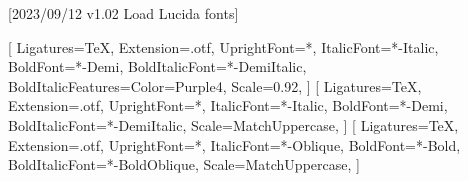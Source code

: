 
[2023/09/12 v1.02 Load Lucida fonts]



\ifpdftex
	\RequirePackage[LY1]{fontenc}
	\RequirePackage{bm}
\else
    \RequirePackage[warnings-off={mathtools-colon,mathtools-overbracket}]{unicode-math}

    
    \setmainfont{LucidaBrightOT}[%
          Ligatures=TeX,
          Extension=.otf,
          UprightFont=*,
          ItalicFont=*-Italic,
          BoldFont=*-Demi,
    	  BoldItalicFont=*-DemiItalic,
          BoldItalicFeatures={Color=Purple4},
    	  Scale=0.92,
      ]
    \setsansfont{LucidaSansOT}[%
          Ligatures=TeX,
          Extension=.otf,
          UprightFont=*,
          ItalicFont=*-Italic,
          BoldFont=*-Demi,
    	  BoldItalicFont=*-DemiItalic,
    	  Scale=MatchUppercase,
      ]
    \setmonofont{LucidaSansTypewriterOT}[%
          Ligatures=TeX,
          Extension=.otf,
          UprightFont=*,
          ItalicFont=*-Oblique,
          BoldFont=*-Bold,
          BoldItalicFont=*-BoldOblique,
      	  Scale=MatchUppercase,
      ]
    
